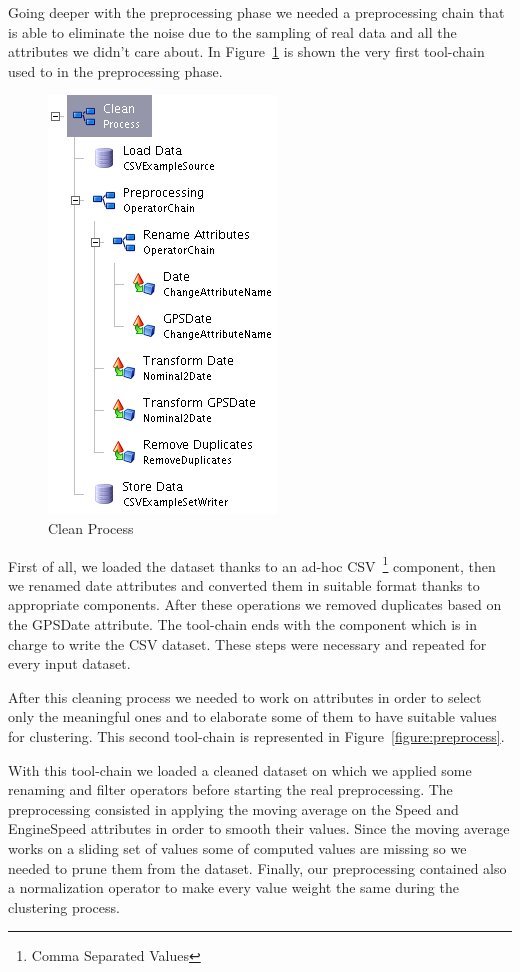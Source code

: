 Going deeper with the preprocessing phase we needed a preprocessing chain that is able to eliminate the noise due to the sampling of real data and all the attributes we didn't care about. In Figure~\ref{figure:clean} is shown the very first tool-chain used to in the preprocessing phase.

\begin{figure}[h!]
\centerline{\includegraphics[scale=0.8]{images/clean.png}}
\caption{Clean Process}
\label{figure:clean}
\end{figure}

First of all, we loaded the dataset thanks to an ad-hoc CSV~\footnote{Comma Separated Values} component, then we renamed date attributes and converted them in suitable format thanks to appropriate components. After these operations we removed duplicates based on the GPSDate attribute. The tool-chain ends with the component which is in charge to write the CSV dataset. These steps were necessary and repeated for every input dataset.

After this cleaning process we needed to work on attributes in order to select only the meaningful ones and to elaborate some of them to have suitable values for clustering. This second tool-chain is represented in Figure~\ref{figure:preprocess}.


With this tool-chain we loaded a cleaned dataset on which we applied some renaming and filter operators before starting the real preprocessing. The preprocessing consisted in applying the moving average on the Speed and EngineSpeed attributes in order to smooth their values. Since the moving average works on a sliding set of values some of computed values are missing so we needed to prune them from the dataset. Finally, our preprocessing contained also a normalization operator to make every value weight the same during the clustering process.
